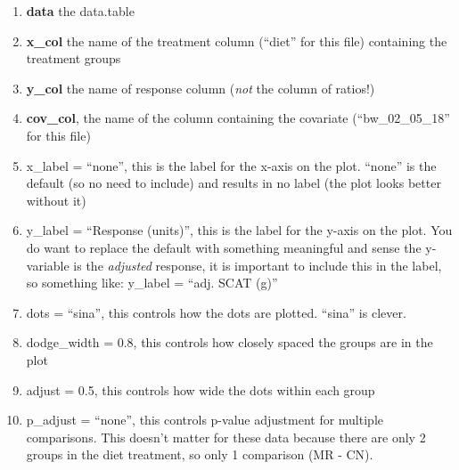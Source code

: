\documentclass[]{book}
\providecommand{\tightlist}{%
  \setlength{\itemsep}{0pt}\setlength{\parskip}{0pt}}
\begin{document}
\begin{enumerate}
\def\labelenumi{\arabic{enumi}.}
\tightlist
\item
  \textbf{data} the data.table
\item
  \textbf{x\_col} the name of the treatment column (``diet'' for this file) containing the treatment groups
\item
  \textbf{y\_col} the name of response column (\emph{not} the column of ratios!)
\item
  \textbf{cov\_col}, the name of the column containing the covariate (``bw\_02\_05\_18'' for this file)
\item
  x\_label = ``none'', this is the label for the x-axis on the plot. ``none'' is the default (so no need to include) and results in no label (the plot looks better without it)
\item
  y\_label = ``Response (units)'', this is the label for the y-axis on the plot. You do want to replace the default with something meaningful and sense the y-variable is the \emph{adjusted} response, it is important to include this in the label, so something like: y\_label = ``adj. SCAT (g)''
\item
  dots = ``sina'', this controls how the dots are plotted. ``sina'' is clever.
\item
  dodge\_width = 0.8, this controls how closely spaced the groups are in the plot
\item
  adjust = 0.5, this controls how wide the dots within each group
\item
  p\_adjust = ``none'', this controls p-value adjustment for multiple comparisons. This doesn't matter for these data because there are only 2 groups in the diet treatment, so only 1 comparison (MR - CN).
\end{enumerate}
\end{document}
